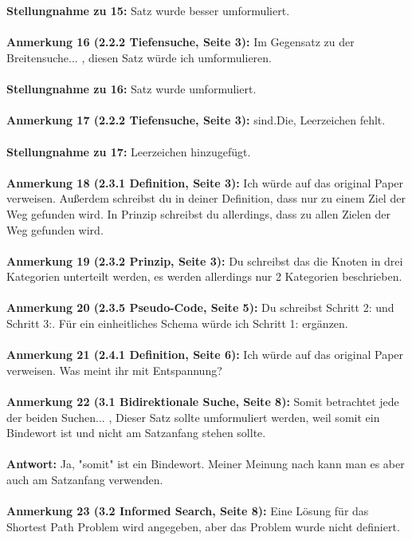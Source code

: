\documentclass[a4paper,12pt]{book}
\begin{document}
\\ \\
\textbf{Stellungnahme zu 15:}
Satz wurde besser umformuliert.
\\ \\
\textbf{Anmerkung 16 (2.2.2 Tiefensuche, Seite 3):}
\grqq Im Gegensatz zu der Breitensuche... \glqq, diesen Satz würde ich umformulieren.
\\ \\
\textbf{Stellungnahme zu 16:}
Satz wurde umformuliert.
\\ \\
\textbf{Anmerkung 17 (2.2.2 Tiefensuche, Seite 3):}
\grqq sind.Die\grqq, Leerzeichen fehlt.
\\ \\
\textbf{Stellungnahme zu 17:}
Leerzeichen hinzugefügt.
\\ \\
\textbf{Anmerkung 18 (2.3.1 Definition, Seite 3):}
Ich würde auf das original Paper verweisen. Außerdem schreibst du in deiner Definition, dass nur zu einem Ziel der Weg gefunden wird. In Prinzip schreibst du allerdings, dass zu allen Zielen der Weg gefunden wird. 
\\ \\
\textbf{Anmerkung 19 (2.3.2 Prinzip, Seite 3):}
Du schreibst das die Knoten in drei Kategorien unterteilt werden, es werden allerdings nur 2 Kategorien beschrieben.
\\ \\
\textbf{Anmerkung 20 (2.3.5 Pseudo-Code, Seite 5):}
Du schreibst Schritt 2: und Schritt 3:. Für ein einheitliches Schema würde ich Schritt 1: ergänzen.
\\ \\
\textbf{Anmerkung 21 (2.4.1 Definition, Seite 6):}
Ich würde auf das original Paper verweisen. 
Was meint ihr mit Entspannung?
\\ \\
\textbf{Anmerkung 22 (3.1 Bidirektionale Suche, Seite 8):}
\grqq Somit betrachtet jede der beiden Suchen... \glqq{}, Dieser Satz sollte umformuliert werden, weil somit ein Bindewort ist und nicht am Satzanfang stehen sollte. 
\\ \\
\textbf{Antwort:}
Ja, "somit" ist ein Bindewort. Meiner Meinung nach kann man es aber auch am Satzanfang verwenden.
\\ \\
\textbf{Anmerkung 23 (3.2 Informed Search, Seite 8):}
Eine Lösung für das Shortest Path Problem wird angegeben, aber das Problem wurde nicht definiert.
\end{document}
